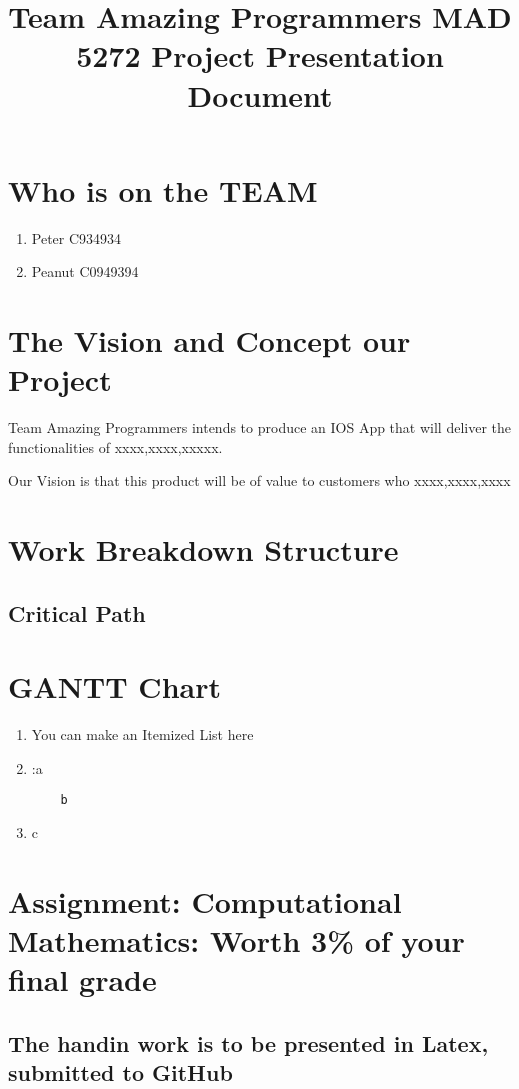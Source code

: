 \documentclass[16pt]{article}
\title{Team Amazing Programmers MAD 5272 Project Presentation Document}
\author{ }
\date{ }
\begin{document}
\maketitle

\section * {Who is on the TEAM}
\begin{enumerate}
\item Peter C934934
\item Peanut C0949394
\end{enumerate}

\section * {The Vision and Concept our Project}

Team Amazing Programmers intends to produce an IOS App that will deliver the functionalities of xxxx,xxxx,xxxxx.

Our Vision is that this product will be of value to customers who xxxx,xxxx,xxxx

\section * {Work Breakdown Structure}
\subsection   {Critical Path}
\section * {GANTT Chart}

\begin{enumerate}
    \item You can make an Itemized List here
    \item:a
    \begin{verbatim}
    b
    \end{verbatim}
    \item   c
\end{enumerate}
  
\section{Assignment: Computational Mathematics: Worth 3\% of your final grade}  
\subsection{The handin work is to be presented in Latex, submitted to GitHub}
\end{document}
